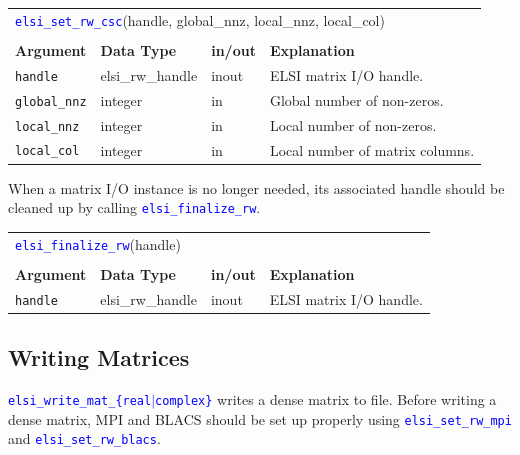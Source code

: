 \documentclass{report}
\newcommand{\api}[1]{\textcolor{blue}{\texttt{#1}}}
\begin{document}
\begin{tabular}[]{|p{25mm}|p{25mm}|p{10mm}|p{102mm}|}
\multicolumn{4}{l}{\api{elsi\_set\_rw\_csc}(handle, global\_nnz, local\_nnz, local\_col)}\\
\multicolumn{4}{l}{}\\
\hline
\multicolumn{1}{|l|}{\textbf{Argument}} & \multicolumn{1}{l|}{\textbf{Data Type}} & \multicolumn{1}{l|}{\textbf{in/out}} & \multicolumn{1}{l|}{\textbf{Explanation}}\\
\hline
\texttt{handle}      & elsi\_rw\_handle & inout & ELSI matrix I/O handle.\\
\hline
\texttt{global\_nnz} & integer          & in    & Global number of non-zeros.\\
\hline
\texttt{local\_nnz}  & integer          & in    & Local number of non-zeros.\\
\hline
\texttt{local\_col}  & integer          & in    & Local number of matrix columns.\\
\hline
\end{tabular}

When a matrix I/O instance is no longer needed, its associated handle should be cleaned up by calling \api{elsi\_finalize\_rw}.

\begin{tabular}[]{|p{25mm}|p{25mm}|p{10mm}|p{102mm}|}
\multicolumn{4}{l}{\api{elsi\_finalize\_rw}(handle)}\\
\multicolumn{4}{l}{}\\
\hline
\multicolumn{1}{|l|}{\textbf{Argument}} & \multicolumn{1}{l|}{\textbf{Data Type}} & \multicolumn{1}{l|}{\textbf{in/out}} & \multicolumn{1}{l|}{\textbf{Explanation}}\\
\hline
\texttt{handle} & elsi\_rw\_handle & inout & ELSI matrix I/O handle.\\
\hline
\end{tabular}

\subsection{Writing Matrices}
\label{subsec:rw_write}
\api{elsi\_write\_mat\_\{real$\vert$complex\}} writes a dense matrix to file. Before writing a dense matrix, MPI and BLACS should be set up properly using \api{elsi\_set\_rw\_mpi} and \api{elsi\_set\_rw\_blacs}.
\end{document}

